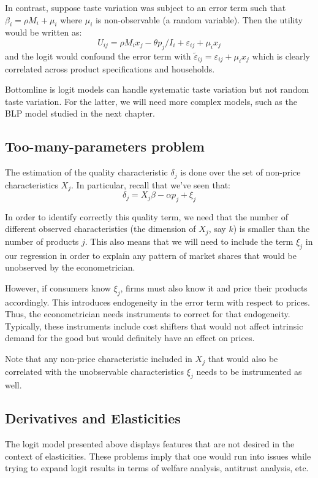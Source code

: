 In contrast, suppose taste variation was subject to an error term such that $\beta_i = \rho M_i + \mu_i$ where $\mu_i$ is non-observable (a random variable). Then the utility would be written as: $$U_{ij} = \rho M_i x_j - \theta p_j/I_i + \varepsilon_{ij} + \mu_ix_j $$ and the logit would confound the error term with $\tilde\varepsilon_{ij} = \varepsilon_{ij} + \mu_ix_j$ which is clearly correlated across product specifications and households.

Bottomline is logit models can handle systematic taste variation but not random taste variation. For the latter, we will need more complex models, such as the BLP model studied in the next chapter.

\subsection{Too-many-parameters problem}

The estimation of the quality characteristic $\delta_j$ is done over the set of non-price characteristics $X_j$. In particular, recall that we've seen that:
$$ \delta_j = X_j\beta - \alpha p_j + \xi_j $$ 

In order to identify correctly this quality term, we need that the number of different observed characteristics (the dimension of $X_j$, say $k$) is smaller than the number of products $j$. This also means that we will need to include the term $\xi_j$ in our regression in order to explain any pattern of market shares that would be unobserved by the econometrician.

However, if consumers know $\xi_j$, firms must also know it and price their products accordingly. This introduces endogeneity in the error term with respect to prices. Thus, the econometrician needs instruments to correct for that endogeneity. Typically, these instruments include cost shifters that would not affect intrinsic demand for the good but would definitely have an effect on prices.

Note that any non-price characteristic included in $X_j$ that would also be correlated with the unobservable characteristics $\xi_j$ needs to be instrumented as well.

\subsection{Derivatives and Elasticities}

The logit model presented above displays features that are not desired in the context of elasticities. These problems imply that one would run into issues while trying to expand logit results in terms of welfare analysis, antitrust analysis, etc.

